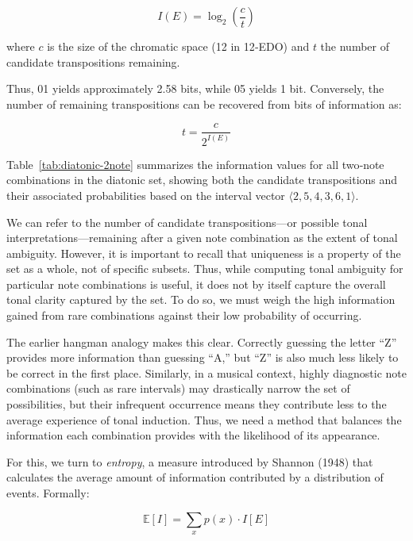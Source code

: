 \documentclass[10pt,twocolumn]{article}
\numberwithin{equation}{section} %
\begin{document}
\begin{equation}
I(E) = \log_{2} \left( \frac{c}{t} \right)
\label{eq:derivingSelfInformation}
\end{equation}

where $c$ is the size of the chromatic space (12 in 12‑EDO) and $t$ the number of candidate transpositions
remaining.

Thus, 01 yields
approximately 2.58 bits, while 05 yields 1 bit. Conversely, the number of
remaining transpositions can be recovered from bits of information as:

\begin{equation}
t = \frac{c}{2^{I(E)}}
\label{eq:remaining_transpositions}
\end{equation}

Table~\ref{tab:diatonic-2note}
summarizes the information values for all two‑note combinations in the diatonic
set, showing both the candidate transpositions and their associated
probabilities based on the interval vector $\langle 2,5,4,3,6,1\rangle$.



We can refer to the number of candidate transpositions—or
possible tonal interpretations—remaining after a given note combination as the
extent of tonal ambiguity. However, it is important to recall that uniqueness
is a property of the set as a whole, not of specific subsets. Thus, while
computing tonal ambiguity for particular note combinations is useful, it does
not by itself capture the overall tonal clarity captured by the set. To do so,
we must weigh the high information gained from rare combinations against their
low probability of occurring.

The earlier hangman analogy makes this clear. Correctly
guessing the letter “Z” provides more information than guessing “A,” but “Z” is
also much less likely to be correct in the first place. Similarly, in a musical
context, highly diagnostic note combinations (such as rare intervals) may
drastically narrow the set of possibilities, but their infrequent occurrence
means they contribute less to the average experience of tonal induction. Thus,
we need a method that balances the information each combination provides with
the likelihood of its appearance.

For this, we turn to \textit{entropy}, a measure introduced by
Shannon (1948) that calculates the average amount of information contributed by
a distribution of events. Formally:

\begin{equation}
\mathbb{E}[I] = \sum_{x} p(x) \cdot I[E]
\label{eq:expected-info}
\end{equation}
\end{document}
